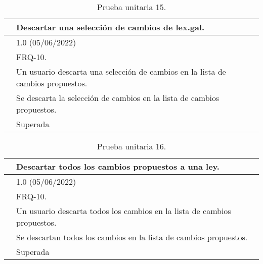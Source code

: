 \begin{table}[H]
\begin{center}
\begin{tabular}{|p{3cm}|p{10cm}|} \hline
\centering {\bf PU-15} & Descartar una selección de cambios de lex.gal.  \\ \hline\hline
\centering {\bf Versión} & 1.0 (05/06/2022) \\ \hline
\centering {\bf Dependencias} & FRQ-10. \\ \hline
\centering {\bf Descripción} &  Un usuario descarta una selección de cambios en la lista de cambios propuestos. \\ \hline
\centering {\bf Criterio de aceptación} & Se descarta la selección de cambios en la lista de cambios propuestos. \\ \hline
\centering {\bf Estado} & Superada \\ \hline
\end{tabular}
\caption{Prueba unitaria 15.}
\label{enlacePU15}
\end{center}
\end{table}

\begin{table}[H]
\begin{center}
\begin{tabular}{|p{3cm}|p{10cm}|} \hline
\centering {\bf PU-16} & Descartar todos los cambios propuestos a una ley.  \\ \hline\hline
\centering {\bf Versión} & 1.0 (05/06/2022) \\ \hline
\centering {\bf Dependencias} & FRQ-10. \\ \hline
\centering {\bf Descripción} &  Un usuario descarta todos los cambios en la lista de cambios propuestos. \\ \hline
\centering {\bf Criterio de aceptación} & Se descartan todos los cambios en la lista de cambios propuestos. \\ \hline
\centering {\bf Estado} & Superada \\ \hline
\end{tabular}
\caption{Prueba unitaria 16.}
\label{enlacePU16}
\end{center}
\end{table}

